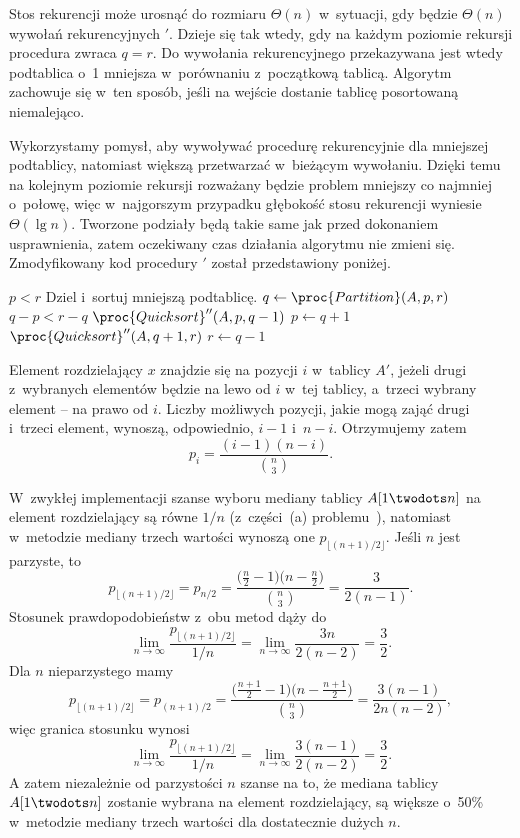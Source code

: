\subproblem %
Stos rekurencji może urosnąć do rozmiaru $\Theta(n)$ w~sytuacji, gdy będzie $\Theta(n)$ wywołań rekurencyjnych $'$. Dzieje się tak wtedy, gdy na każdym poziomie rekursji procedura  zwraca $q=r$. Do wywołania rekurencyjnego przekazywana jest wtedy podtablica o~1 mniejsza w~porównaniu z~początkową tablicą. Algorytm zachowuje się w~ten sposób, jeśli na wejście dostanie tablicę posortowaną niemalejąco.

\subproblem %
Wykorzystamy pomysł, aby wywoływać procedurę rekurencyjnie dla mniejszej podtablicy, natomiast większą przetwarzać w~bieżącym wywołaniu. Dzięki temu na kolejnym poziomie rekursji rozważany będzie problem mniejszy co najmniej o~połowę, więc w~najgorszym przypadku głębokość stosu rekurencji wyniesie $\Theta(\lg n)$. Tworzone podziały będą takie same jak przed dokonaniem usprawnienia, zatem oczekiwany czas działania algorytmu nie zmieni się. Zmodyfikowany kod procedury $'$ został przedstawiony poniżej.
\begin{codebox}
\li	\While $p<r$
\li		\Do
			\Comment Dziel i~sortuj mniejszą podtablicę.
\li			$q\gets\proc{Partition}(A,p,r)$
\li			\If $q-p<r-q$
\li				\Then
					$\proc{Quicksort}''(A,p,q-1)$
\li					$p\gets q+1$
\li				\Else
					$\proc{Quicksort}''(A,q+1,r)$
\li					$r\gets q-1$
				\End
		\End
\end{codebox}


\subproblem %
Element rozdzielający $x$ znajdzie się na pozycji $i$ w~tablicy $A'$, jeżeli drugi z~wybranych elementów będzie na lewo od $i$ w~tej tablicy, a~trzeci wybrany element -- na prawo od $i$. Liczby możliwych pozycji, jakie mogą zająć drugi i~trzeci element, wynoszą, odpowiednio, $i-1$ i~$n-i$. Otrzymujemy zatem
\[
	p_i = \frac{(i-1)(n-i)}{\binom{n}{3}}.
\]

\subproblem %
W~zwykłej implementacji szanse wyboru mediany tablicy $A[1\twodots n]$ na element rozdzielający są równe $1/n$ (z~części~(a) problemu~), natomiast w~metodzie mediany trzech wartości wynoszą one $p_{\lfloor(n+1)/2\rfloor}$. Jeśli $n$ jest parzyste, to
\[
	p_{\lfloor(n+1)/2\rfloor} = p_{n/2} = \frac{\bigl(\frac{n}{2}-1\bigr)\bigl(n-\frac{n}{2}\bigr)}{\binom{n}{3}} = \frac{3}{2(n-1)}.
\]
Stosunek prawdopodobieństw z~obu metod dąży do
\[
    \lim_{n\to\infty}\frac{p_{\lfloor(n+1)/2\rfloor}}{1/n} = \lim_{n\to\infty}\frac{3n}{2(n-2)} = \frac{3}{2}.
\]
Dla $n$ nieparzystego mamy
\[
	p_{\lfloor(n+1)/2\rfloor} = p_{(n+1)/2} = \frac{\bigl(\frac{n+1}{2}-1\bigr)\bigl(n-\frac{n+1}{2}\bigr)}{\binom{n}{3}} = \frac{3(n-1)}{2n(n-2)},
\]
więc granica stosunku wynosi
\[
    \lim_{n\to\infty}\frac{p_{\lfloor(n+1)/2\rfloor}}{1/n} = \lim_{n\to\infty}\frac{3(n-1)}{2(n-2)} = \frac{3}{2}.
\]
A zatem niezależnie od parzystości $n$ szanse na to, że mediana tablicy $A[1\twodots n]$ zostanie wybrana na element rozdzielający, są większe o~50\% w~metodzie mediany trzech wartości dla dostatecznie dużych $n$.

